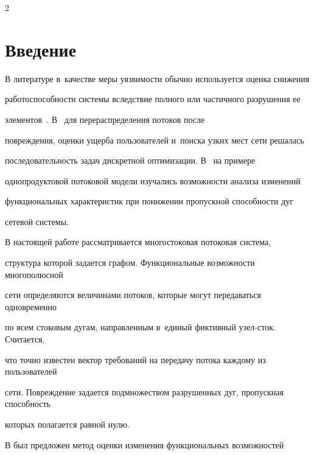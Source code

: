 \begin{multicols}{2}





\label{st\stat}





\section{Введение}





В литературе в~качестве меры уязвимости обычно используется оценка снижения  


работоспособности системы вследствие полного или частичного  разрушения ее  


элементов~\cite{Mur13}. В~\cite{Naz03, Naz06} для перераспределения потоков после 


повреждения, оценки ущерба  пользователей и~поиска узких мест сети решалась 


последовательность задач дискретной оптимизации. В~\cite{Mal17} на примере 


однопродуктовой потоковой модели изучались возможности анализа изменений 


функциональных характеристик при понижении пропускной способности дуг  


сетевой системы.





В настоящей работе рассматривается многостоковая  потоковая система, 


структура которой задается графом. Функциональные возможности многополюсной  


сети определяются величинами потоков, которые могут  передаваться одновременно 


по всем стоковым дугам, направленным в~единый фиктивный узел-сток. Считается, 


что точно известен  вектор требований на передачу потока  каждому из пользователей 


сети. Повреждение задается подмножеством разрушенных дуг, пропускная способность 


которых полагается  равной   нулю.





В \cite{MalInf17} был предложен метод оценки изменения функциональных возможностей 



\end{multicols}
